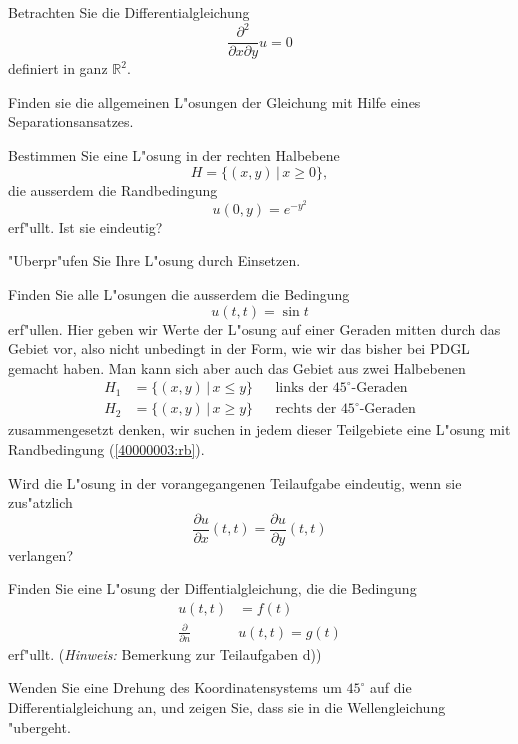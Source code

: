 Betrachten Sie die Differentialgleichung
\[
\frac{\partial^2}{\partial x\partial y}u=0
\]
definiert in ganz $\mathbb R^2$.
\begin{teilaufgaben}
\item
Finden sie die allgemeinen L"osungen der Gleichung
mit Hilfe eines Separationsansatzes.
\item
Bestimmen Sie eine L"osung in der rechten Halbebene
\[
H=\{(x,y)\,|\, x\ge 0\},
\]
die ausserdem die Randbedingung
\[
u(0,y)=e^{-y^2}
\]
erf"ullt. Ist sie eindeutig?
\item
"Uberpr"ufen Sie Ihre L"osung durch Einsetzen.
\item
Finden Sie alle L"osungen die ausserdem die Bedingung
\begin{equation}
u(t,t)=\sin t
\label{40000003:rb}
\end{equation}
erf"ullen. Hier geben wir Werte der L"osung auf einer Geraden
mitten durch das Gebiet vor, also nicht unbedingt in der Form,
wie wir das bisher bei PDGL gemacht haben. Man kann sich aber
auch das Gebiet aus zwei Halbebenen
\begin{align*}
H_1&=\{(x,y)\,|\,x\le y\}&&\text{links der $45^\circ$-Geraden}
\\
H_2&=\{(x,y)\,|\,x\ge y\}&&\text{rechts der $45^\circ$-Geraden}
\end{align*}
zusammengesetzt denken, wir suchen in jedem dieser Teilgebiete eine
L"osung mit Randbedingung (\ref{40000003:rb}).
\label{40000003:halbebenen}
\item
Wird die L"osung in der vorangegangenen Teilaufgabe eindeutig, wenn sie
zus"atzlich
\[
\frac{\partial u}{\partial x}(t,t)=\frac{\partial u}{\partial y}(t,t)
\]
verlangen?
\item
Finden Sie eine L"osung der Diffentialgleichung, die
die Bedingung
\begin{align*}
u(t,t)&=f(t)\\
\frac{\partial}{\partial n}&u(t,t)=g(t)
\end{align*}
erf"ullt. ({\it Hinweis:} Bemerkung zur Teilaufgaben d))
\item
Wenden Sie eine Drehung des Koordinatensystems um $45^\circ$
auf die Differentialgleichung an, und zeigen Sie,
dass sie in die Wellengleichung "ubergeht.
\end{teilaufgaben}

